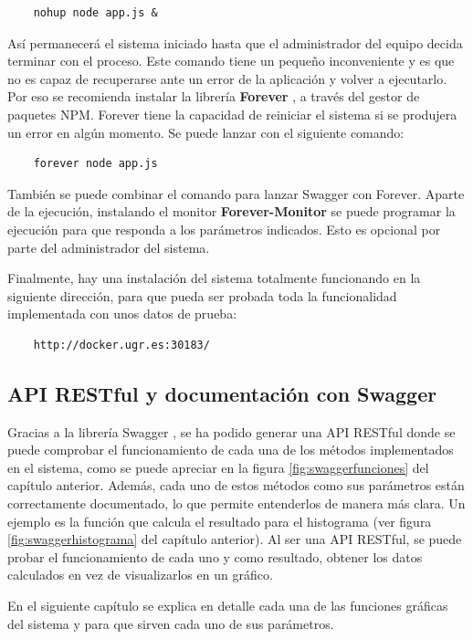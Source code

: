 \begin{verbatim}
	nohup node app.js &
\end{verbatim}

Así permanecerá el sistema iniciado hasta que el administrador del equipo decida terminar con el proceso. Este comando tiene un pequeño inconveniente y es que no es capaz de recuperarse ante un error de la aplicación y volver a ejecutarlo. Por eso se recomienda instalar la librería \textbf{Forever} \cite{ForeverInicial}, a través del gestor de paquetes NPM. Forever tiene la capacidad de reiniciar el sistema si se produjera un error en algún momento. Se puede lanzar con el siguiente comando:

\begin{verbatim}
	forever node app.js
\end{verbatim}

También se puede combinar el comando para lanzar Swagger con Forever.
Aparte de la ejecución, instalando el monitor \textbf{Forever-Monitor} \cite{ForeverMonitor} se puede programar la ejecución para que responda a los parámetros indicados. Esto es opcional por parte del administrador del sistema.

Finalmente, hay una instalación del sistema totalmente funcionando en la siguiente dirección, para que pueda ser probada toda la funcionalidad implementada con unos datos de prueba:

\begin{verbatim}
	http://docker.ugr.es:30183/
\end{verbatim}

\subsection{API RESTful y documentación con Swagger}

Gracias a la librería Swagger \cite{SwaggerInicial}, se ha podido generar una API RESTful donde se puede comprobar el funcionamiento de cada una de los métodos implementados en el sistema, como se puede apreciar en la figura \ref{fig:swaggerfunciones} del capítulo anterior. Además, cada uno de estos métodos como sus parámetros están correctamente documentado, lo que permite entenderlos de manera más clara. Un ejemplo es la función que calcula el resultado para el histograma (ver figura \ref{fig:swaggerhistograma} del capítulo anterior). Al ser una API RESTful, se puede probar el funcionamiento de cada uno y como resultado, obtener los datos calculados en vez de visualizarlos en un gráfico.

En el siguiente capítulo se explica en detalle cada una de las funciones gráficas del sistema y para que sirven cada uno de sus parámetros.





